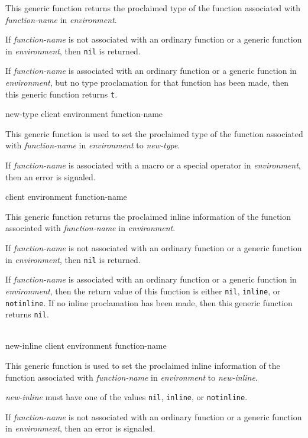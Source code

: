 This generic function returns the proclaimed type of the function
associated with \textit{function-name} in \textit{environment}.

If \textit{function-name} is not associated with an ordinary function
or a generic function in \textit{environment}, then \texttt{nil} is
returned.

If \textit{function-name} is associated with an ordinary function or a
generic function in \textit{environment}, but no type proclamation for
that function has been made, then this generic function returns
\texttt{t}.

 {new-type client environment function-name}

This generic function is used to set the proclaimed type of the
function associated with \textit{function-name} in
\textit{environment} to \textit{new-type}.

If \textit{function-name} is associated with a macro or a special
operator in \textit{environment}, then an error is signaled.

 {client environment function-name}

This generic function returns the proclaimed inline information of the
function associated with \textit{function-name} in
\textit{environment}.

If \textit{function-name} is not associated with an ordinary function
or a generic function in \textit{environment}, then \texttt{nil} is
returned.

If \textit{function-name} is associated with an ordinary function or a
generic function in \textit{environment}, then the return value of
this function is either \texttt{nil}, \texttt{inline}, or
\texttt{notinline}.  If no inline proclamation has been made, then
this generic function returns \texttt{nil}.

\\
{new-inline client environment function-name}

This generic function is used to set the proclaimed inline information
of the function associated with \textit{function-name} in
\textit{environment} to \textit{new-inline}.

\textit{new-inline} must have one of the values \texttt{nil},
\texttt{inline}, or \texttt{notinline}.

If \textit{function-name} is not associated with an ordinary function
or a generic function in \textit{environment}, then an error is
signaled.


